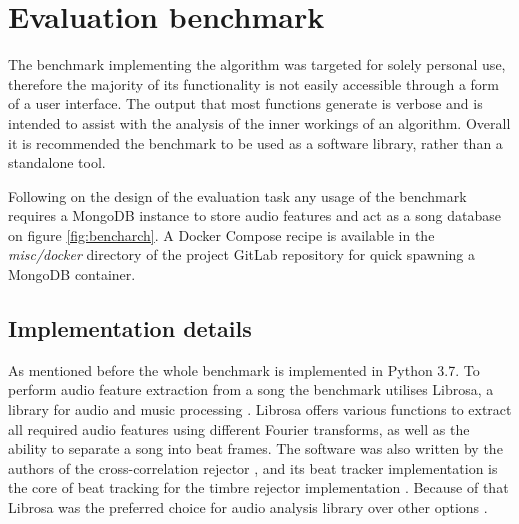 
\chapter{Evaluation benchmark}
\label{chap:benchmark}
\ifpdf
    \graphicspath{{Algorithms/Figures/PNG/}{EvaluationTask/Figures/PDF/}{Algorithms/Figures/}}
\else
    \graphicspath{{Algorithms/Figures/EPS/}{EvaluationTask/Figures/}}
\fi



The benchmark implementing the algorithm was targeted for solely personal use,
therefore the majority of its functionality is not easily accessible through a
form of a user interface. The output that most functions generate is verbose and
is intended to assist with the analysis of the inner workings of an algorithm.
Overall it is recommended the benchmark to be used as a software library, rather
than a standalone tool.

Following on the design of the evaluation task any usage of the benchmark
requires a MongoDB instance to store audio features and act as a song
database on figure \ref{fig:bencharch}. A Docker Compose recipe is available in
the \textit{misc/docker} directory of the project GitLab repository for quick
spawning a MongoDB container.

\section{Implementation details} 
\label{sec:implementation}

As mentioned before the whole benchmark is implemented in Python 3.7. To perform
audio feature extraction from a song the benchmark utilises Librosa, a library
for  audio and music processing \cite{librosa}. Librosa offers various functions
to extract all required audio features using different Fourier transforms, as
well as the ability to separate a song into beat frames. The software was also
written by the authors of the cross-correlation rejector \cite{ellis2008cross},
and its beat tracker implementation is the core of beat tracking for the timbre
rejector implementation \cite{tralie2015cover}. Because of that Librosa was
the preferred choice for audio analysis library over other options \cite{aubio}
\cite{pyAudioAnalysis}.

